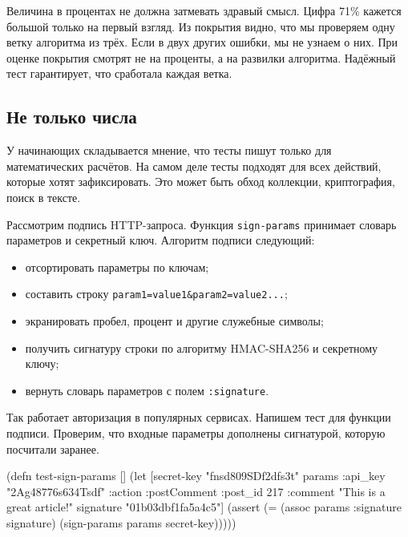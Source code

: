 Величина в процентах не должна затмевать здравый смысл. Цифра 71\% кажется
большой только на первый взгляд. Из покрытия видно, что мы проверяем одну ветку
алгоритма из трёх. Если в двух других ошибки, мы не узнаем о них. При оценке
покрытия смотрят не на проценты, а на развилки алгоритма. Надёжный тест
гарантирует, что сработала каждая ветка.

\subsection{Не только числа}

У начинающих складывается мнение, что тесты пишут только для математических
расчётов. На самом деле тесты подходят для всех действий, которые хотят
зафиксировать. Это может быть обход коллекции, криптография, поиск в тексте.

Рассмотрим подпись HTTP-запроса. Функция \verb|sign-params| принимает словарь
параметров и секретный ключ. Алгоритм подписи следующий:

\begin{itemize}


\item
  отсортировать параметры по ключам;

\item
  составить строку \verb|param1=value1&param2=value2...|;

\item
  экранировать пробел, процент и другие служебные символы;

\item
  получить сигнатуру строки по алгоритму HMAC-SHA256 и секретному ключу;

\item
  вернуть словарь параметров с полем \verb|:signature|.

\end{itemize}


Так работает авторизация в популярных сервисах. Напишем тест для функции
подписи. Проверим, что входные параметры дополнены сигнатурой, которую посчитали
заранее.

\begin{english}
  \begin{clojure}
(defn test-sign-params []
  (let [secret-key "fnsd809SDf2dfs3t"
        params {:api_key "2Ag48776s634Tsdf"
                :action :postComment
                :post_id 217
                :comment "This is a great article!"}
        signature "01b03dbf1fa5a4c5"]
    (assert (= (assoc params :signature signature)
               (sign-params params secret-key)))))
  \end{clojure}
\end{english}

